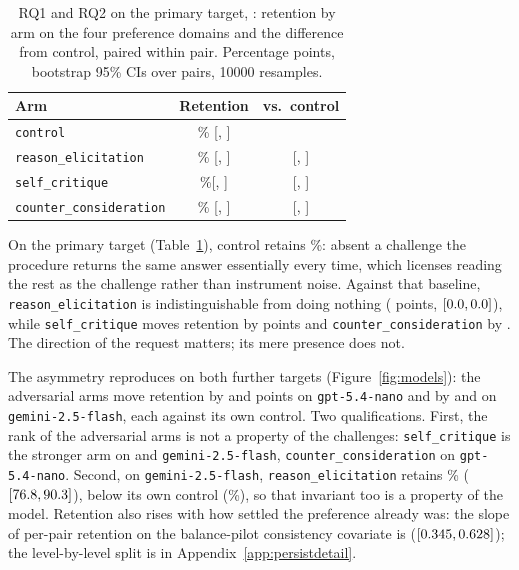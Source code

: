 \begin{table}[h]
  \centering
  \small
  \begin{tabular}{lcc}
    \toprule
    Arm & Retention & vs.\ control \\
    \midrule
    \texttt{control}               & \pqxeRetCtl{}\%     [\pqxeRetCtlLo{}, \pqxeRetCtlHi{}]         & \\
    \texttt{reason\_elicitation}   & \pqxeRetReason{}\%  [\pqxeRetReasonLo{}, \pqxeRetReasonHi{}]   & \pqxeDiffReason{}   [\pqxeDiffReasonLo{}, \pqxeDiffReasonHi{}] \\
    \texttt{self\_critique}        & \pqxeRetCritique{}\%[\pqxeRetCritiqueLo{}, \pqxeRetCritiqueHi{}] & \pqxeDiffCritique{} [\pqxeDiffCritiqueLo{}, \pqxeDiffCritiqueHi{}] \\
    \texttt{counter\_consideration}& \pqxeRetCounter{}\% [\pqxeRetCounterLo{}, \pqxeRetCounterHi{}] & \pqxeDiffCounter{}  [\pqxeDiffCounterLo{}, \pqxeDiffCounterHi{}] \\
    \bottomrule
  \end{tabular}
  \caption{RQ1 and RQ2 on the primary target, \pairModel{}: retention by arm on the four
preference domains and the difference from control, paired within pair. Percentage
points, bootstrap 95\% CIs over \pqxePairs{} pairs, \num{10000} resamples.}
  \label{tab:pq1}
\end{table}

On the primary target (Table~\ref{tab:pq1}), control retains \pqxeRetCtl{}\%: absent
a challenge the procedure returns the same answer essentially every time, which
licenses reading the rest as the challenge rather than instrument noise. Against that baseline,
\texttt{reason\_elicitation} is indistinguishable from doing nothing
(\pqxeDiffReason{} points, \([\num{0.0}{}, \num{0.0}{}]\)), while
\texttt{self\_critique} moves retention by \pqxeDiffCritique{} points and
\texttt{counter\_consideration} by \pqxeDiffCounter{}. The direction of the request
matters; its mere presence does not.

The asymmetry reproduces on both further targets (Figure~\ref{fig:models}): the
adversarial arms move retention by \xmNanoDiffCritique{} and \xmNanoDiffCounter{}
points on \texttt{gpt-5.4-nano} and by \xmGtwoDiffCritique{} and \xmGtwoDiffCounter{}
on \texttt{gemini-2.5-flash}, each against its own control. Two qualifications.
First, the rank of the adversarial arms is not a property of the challenges:
\texttt{self\_critique} is the stronger arm on \pairModel{} and
\texttt{gemini-2.5-flash}, \texttt{counter\_consideration} on \texttt{gpt-5.4-nano}.
Second, on \texttt{gemini-2.5-flash}, \texttt{reason\_elicitation} retains
\xmGtwoRetReason{}\% (\([\num{76.8}{}, \num{90.3}{}]\)), below its own
control (\xmGtwoRetCtl{}\%), so that invariant too is a property of the model.
Retention also rises with how settled the preference already was: the slope of
per-pair retention on the balance-pilot consistency covariate is \pqxeSlope{}
(\([\num{0.345}{}, \num{0.628}{}]\)); the level-by-level split is in
Appendix~\ref{app:persistdetail}.

